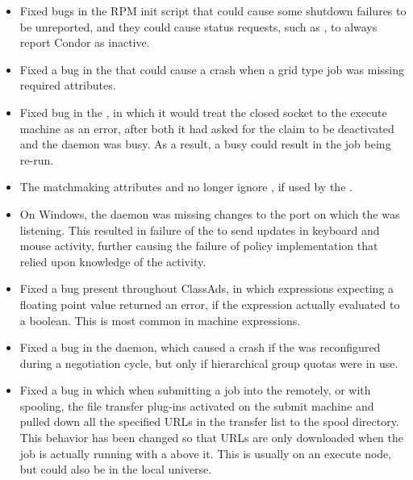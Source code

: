 \begin{itemize}
\item Fixed bugs in the RPM init script that could cause some 
shutdown failures to be unreported, 
and they could cause status requests,
such as ,
to always report Condor as inactive.

\item Fixed a bug in the  that could cause a crash 
when a grid type  job was missing required attributes.

\item Fixed bug in the , in which it would treat 
the closed socket to the execute machine as an error,
after both it had asked for the claim to be deactivated and the 
 daemon was busy.  
As a result, a busy  could result in the job being re-run.

\item The matchmaking attributes 
 and  
no longer ignore , if used by the .

\item On Windows, the  daemon was missing changes to the
port on which the  was listening.
This resulted in failure of the  to send updates in 
keyboard and mouse activity,
further causing the failure of policy implementation that relied upon 
knowledge of the activity.

\item Fixed a bug present throughout ClassAds,
in which expressions expecting a floating point value returned an error,
if the expression actually evaluated to a boolean.
This is most common in machine  expressions.

\item Fixed a bug in the  daemon,
which caused a crash if the  was reconfigured 
during a negotiation cycle, 
but only if hierarchical group quotas were in use.

\item Fixed a bug in which when submitting a job into the 
remotely, or with spooling, 
the file transfer plug-ins activated on the submit machine 
and pulled down all the specified URLs in the transfer list 
to the spool directory. 
This behavior has been changed so that URLs are only downloaded 
when the job is actually running with a  above it. 
This is usually on an execute node, but could also be in the local universe. 


\end{itemize}
